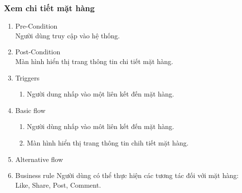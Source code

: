 \subsubsection{Xem chi tiết mặt hàng}
\begin{enumerate}
	\item Pre-Condition\\
	Người dùng truy cập vào hệ thống.
	\item Post-Condition\\
	Màn hình hiển thị trang thông tin chi tiết mặt hàng.
	\item Triggers
	\begin{enumerate}
		\item Người dung nhấp vào một liên kết đến mặt hàng.
	\end{enumerate}
	\item Basic flow
	\begin{enumerate}
		\item Người dùng nhấp vào môt liên kết đến mặt hàng.
		\item Màn hình hiển thị trang thông tin chih tiết mặt hàng.
	\end{enumerate}
	\item Alternative flow
	\item Business rule
	Người dùng có thể thực hiện các tương tác đối với mặt hàng: Like, Share, Post, Comment.
\end{enumerate}

